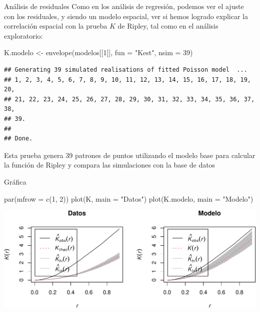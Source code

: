 \documentclass[
  11pt,
  ignorenonframetext,
]{beamer}
\newenvironment{Shaded}{}{}
\newcommand{\AttributeTok}[1]{\textcolor[rgb]{0.49,0.56,0.16}{#1}}
\newcommand{\DecValTok}[1]{\textcolor[rgb]{0.25,0.63,0.44}{#1}}
\newcommand{\FunctionTok}[1]{\textcolor[rgb]{0.02,0.16,0.49}{#1}}
\newcommand{\NormalTok}[1]{#1}
\newcommand{\OtherTok}[1]{\textcolor[rgb]{0.00,0.44,0.13}{#1}}
\newcommand{\StringTok}[1]{\textcolor[rgb]{0.25,0.44,0.63}{#1}}
\begin{document}
\begin{frame}[fragile]{Análisis de residuales}
\protect\hypertarget{anuxe1lisis-de-residuales}{}
Como en los análisis de regresión, podemos ver el ajuste con los
residuales, y siendo un modelo espacial, ver si hemos logrado explicar
la correlación espacial con la prueba \(K\) de Ripley, tal como en el
análisis exploratorio:

\begin{Shaded}
\begin{Highlighting}[]
\NormalTok{K.modelo }\OtherTok{\textless{}{-}} \FunctionTok{envelope}\NormalTok{(modelos[[}\DecValTok{1}\NormalTok{]], }\AttributeTok{fun =} \StringTok{"Kest"}\NormalTok{, }\AttributeTok{nsim =} \DecValTok{39}\NormalTok{)}
\end{Highlighting}
\end{Shaded}

\begin{verbatim}
## Generating 39 simulated realisations of fitted Poisson model  ...
## 1, 2, 3, 4, 5, 6, 7, 8, 9, 10, 11, 12, 13, 14, 15, 16, 17, 18, 19, 20,
## 21, 22, 23, 24, 25, 26, 27, 28, 29, 30, 31, 32, 33, 34, 35, 36, 37, 38, 
## 39.
## 
## Done.
\end{verbatim}

Esta prueba genera 39 patrones de puntos utilizando el modelo base para
calcular la función de Ripley y compara las simulaciones con la base de
datos
\end{frame}

\begin{frame}[fragile]{Gráfica}
\protect\hypertarget{gruxe1fica}{}
\begin{Shaded}
\begin{Highlighting}[]
\FunctionTok{par}\NormalTok{(}\AttributeTok{mfrow =} \FunctionTok{c}\NormalTok{(}\DecValTok{1}\NormalTok{, }\DecValTok{2}\NormalTok{))}
\FunctionTok{plot}\NormalTok{(K, }\AttributeTok{main =} \StringTok{"Datos"}\NormalTok{)}
\FunctionTok{plot}\NormalTok{(K.modelo, }\AttributeTok{main =} \StringTok{"Modelo"}\NormalTok{)}
\end{Highlighting}
\end{Shaded}

\begin{center}\includegraphics{Tutorial-spatstat-2_files/figure-beamer/unnamed-chunk-20-1} \end{center}
\end{frame}
\end{document}
